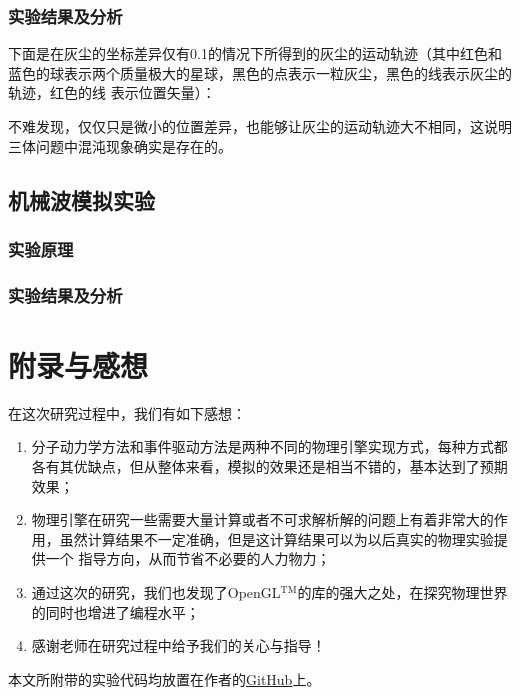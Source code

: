 ﻿\documentclass{article}
\begin{document}
	\subsubsection*{实验结果及分析}
	下面是在灰尘的坐标差异仅有0.1的情况下所得到的灰尘的运动轨迹（其中红色和蓝色的球表示两个质量极大的星球，黑色的点表示一粒灰尘，黑色的线表示灰尘的轨迹，红色的线
	表示位置矢量）：
	\begin{figure}[H]
		\centering
	\end{figure}
	\begin{figure}[H]
		\centering
	\end{figure}
	不难发现，仅仅只是微小的位置差异，也能够让灰尘的运动轨迹大不相同，这说明三体问题中混沌现象确实是存在的。
	\subsection{机械波模拟实验}
	\subsubsection*{实验原理}
	\subsubsection*{实验结果及分析}
	\section{附录与感想}
	\noindent 在这次研究过程中，我们有如下感想：
	\begin{enumerate}
		\item 分子动力学方法和事件驱动方法是两种不同的物理引擎实现方式，每种方式都各有其优缺点，但从整体来看，模拟的效果还是相当不错的，基本达到了预期效果；
		\item 物理引擎在研究一些需要大量计算或者不可求解析解的问题上有着非常大的作用，虽然计算结果不一定准确，但是这计算结果可以为以后真实的物理实验提供一个
		指导方向，从而节省不必要的人力物力；
		\item 通过这次的研究，我们也发现了OpenGL$^\text{TM}$的库的强大之处，在探究物理世界的同时也增进了编程水平；
		\item 感谢老师在研究过程中给予我们的关心与指导！
	\end{enumerate}
	本文所附带的实验代码均放置在作者的\href{https://github.com/PrayStarJirachi/OpenGL-Physical-Engine}{GitHub}上。
	
	
\end{document}
